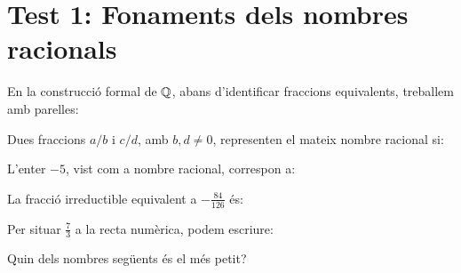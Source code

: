 \section{Test 1: Fonaments dels nombres racionals}


\begin{enumerate}
\pregunta En la construcció formal de \(\mathbb{Q}\), abans d'identificar fraccions equivalents, treballem amb parelles:
\begin{enumerate}
\end{enumerate}
\feedback

\pregunta Dues fraccions \(a/b\) i \(c/d\), amb \(b,d\neq0\), representen el mateix nombre racional si:
\begin{enumerate}
\end{enumerate}
\feedback

\pregunta L'enter \(-5\), vist com a nombre racional, correspon a:
\begin{enumerate}
\end{enumerate}
\feedback

\pregunta La fracció irreductible equivalent a \(-\frac{84}{126}\) és:
\begin{enumerate}
\end{enumerate}
\feedback

\pregunta Per situar \(\frac{7}{3}\) a la recta numèrica, podem escriure:
\begin{enumerate}
\end{enumerate}
\feedback

\pregunta Quin dels nombres següents és el més petit?
\begin{enumerate}
\end{enumerate}
\feedback


\end{enumerate}
